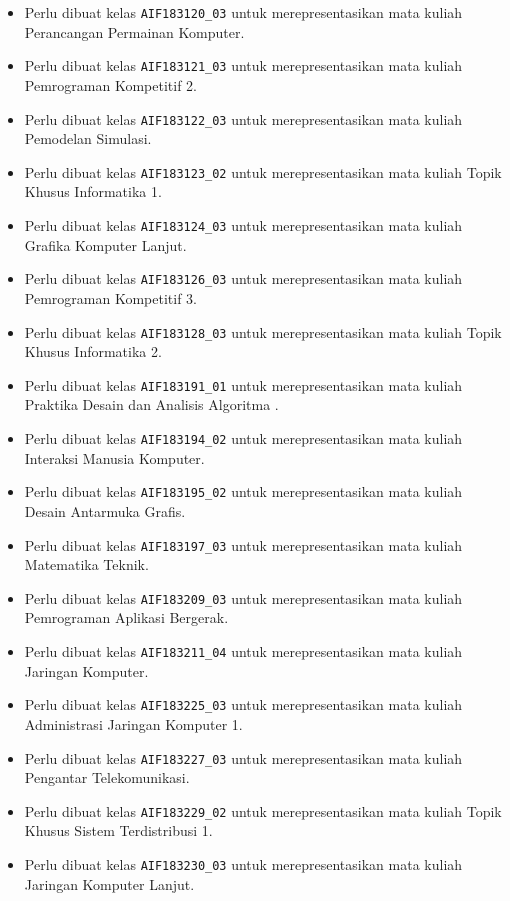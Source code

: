 \begin{enumerate}
\begin{itemize}
		\item Perlu dibuat kelas \texttt{AIF183120\_03} untuk merepresentasikan mata kuliah Perancangan Permainan Komputer.
		\item Perlu dibuat kelas \texttt{AIF183121\_03} untuk merepresentasikan mata kuliah Pemrograman Kompetitif 2.
		\item Perlu dibuat kelas \texttt{AIF183122\_03} untuk merepresentasikan mata kuliah Pemodelan Simulasi.
		\item Perlu dibuat kelas \texttt{AIF183123\_02} untuk merepresentasikan mata kuliah Topik Khusus Informatika 1.
		\item Perlu dibuat kelas \texttt{AIF183124\_03} untuk merepresentasikan mata kuliah Grafika Komputer Lanjut.
		\item Perlu dibuat kelas \texttt{AIF183126\_03} untuk merepresentasikan mata kuliah Pemrograman Kompetitif 3.
		\item Perlu dibuat kelas \texttt{AIF183128\_03} untuk merepresentasikan mata kuliah Topik Khusus Informatika 2.
		\item Perlu dibuat kelas \texttt{AIF183191\_01} untuk merepresentasikan mata kuliah Praktika Desain dan Analisis Algoritma .
		\item Perlu dibuat kelas \texttt{AIF183194\_02} untuk merepresentasikan mata kuliah Interaksi Manusia Komputer.
		\item Perlu dibuat kelas \texttt{AIF183195\_02} untuk merepresentasikan mata kuliah Desain Antarmuka Grafis.
		\item Perlu dibuat kelas \texttt{AIF183197\_03} untuk merepresentasikan mata kuliah Matematika Teknik.
		\item Perlu dibuat kelas \texttt{AIF183209\_03} untuk merepresentasikan mata kuliah Pemrograman Aplikasi Bergerak.
		\item Perlu dibuat kelas \texttt{AIF183211\_04} untuk merepresentasikan mata kuliah Jaringan Komputer.
		\item Perlu dibuat kelas \texttt{AIF183225\_03} untuk merepresentasikan mata kuliah Administrasi Jaringan Komputer 1.
		\item Perlu dibuat kelas \texttt{AIF183227\_03} untuk merepresentasikan mata kuliah Pengantar Telekomunikasi.
		\item Perlu dibuat kelas \texttt{AIF183229\_02} untuk merepresentasikan mata kuliah Topik Khusus Sistem Terdistribusi 1.
		\item Perlu dibuat kelas \texttt{AIF183230\_03} untuk merepresentasikan mata kuliah Jaringan Komputer Lanjut.

\end{itemize}
\end{enumerate}
